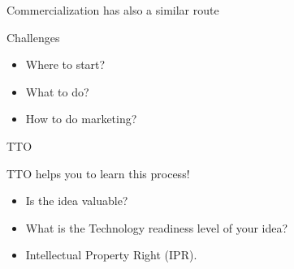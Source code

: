 \documentclass[12pt]{beamer}
\begin{document}
\begin{frame}{Commercialization has also a similar route}
\begin{block}{Challenges}

\begin{itemize}
\item<1-> Where to start?
\item<2-> What to do?
\item<3-> How to do marketing?
\end{itemize}
\end{block}

\end{frame}
\begin{frame}{TTO}
\begin{block}{TTO helps you to learn this process!}
\begin{itemize}
\item<1-> Is the idea valuable?
\item<2-> What is the Technology readiness level of your idea?
\item<3-> Intellectual Property Right (IPR).
\end{itemize}
\end{block}

\end{frame}
\end{document}
